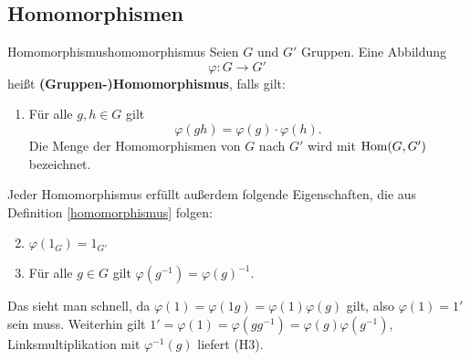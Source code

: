 \subsection{Homomorphismen}
\label{subsec:homomorphismen}
\begin{definition}{Homomorphismus}{homomorphismus}
Seien $G$ und $G'$ Gruppen. Eine Abbildung 
\begin{equation}
\varphi: G \to G'
\end{equation}
heißt \textbf{(Gruppen-)Homomorphismus}, falls gilt:
\begin{enumerate}[({H}1)]
\item Für alle $g,h \in G$ gilt 
\begin{equation}
\varphi(gh) = \varphi(g) \cdot \varphi(h).
\end{equation}
Die Menge der Homomorphismen von $G$ nach $G'$ wird mit $\operatorname{\text{Hom}} (G, G')$ bezeichnet.
\end{enumerate}
\end{definition}
\begin{bemerkung}
Jeder Homomorphismus erfüllt außerdem folgende Eigenschaften, die aus Definition \ref{homomorphismus} folgen:
\begin{enumerate}[({H}1)]
\setcounter{enumi}{1}
\item $\varphi (1_G) = 1_{G'}$
\item Für alle $g \in G$ gilt $\varphi (g^{-1}) = \varphi (g)^{-1}$.
\end{enumerate}
Das sieht man schnell, da $\varphi(1) = \varphi(1g) = \varphi(1) \varphi(g)$ gilt, also $\varphi(1) = 1'$ sein muss. Weiterhin gilt $1' = \varphi(1) = \varphi(gg^{-1}) = \varphi(g) \varphi(g^{-1})$, Linksmultiplikation mit $\varphi^{-1}(g)$ liefert (H3).
\end{bemerkung}
